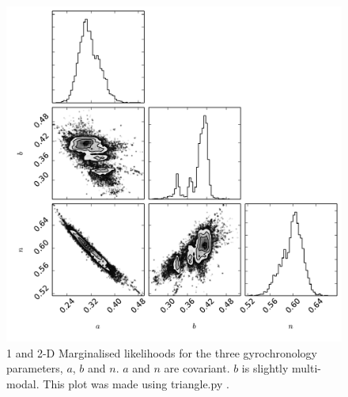 \documentclass[11pt,preprint]{aastex}
\begin{document}
\begin{figure}[ht]
\begin{center}
\includegraphics[width=6in, clip=false, trim=0 0 0.5in 0]{small_triangleACHF45.pdf}
\caption{1 and 2-D Marginalised likelihoods for the three gyrochronology
parameters, $a$, $b$ and $n$. $a$ and $n$ are covariant. $b$ is slightly
multi-modal. This plot was made using triangle.py
\citep{Foreman-Mackey_triangle}.
\label{fig:triangle}}
\end{center}
\end{figure}
\end{document}
